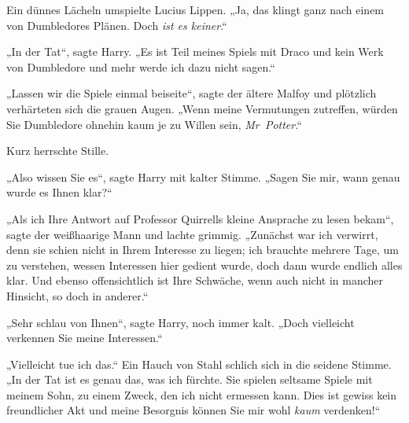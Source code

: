 Ein dünnes Lächeln umspielte Lucius Lippen.
„Ja, das klingt ganz nach einem von Dumbledores Plänen. Doch \emph{ist es keiner}.“

„In der Tat“, sagte Harry.
„Es ist Teil meines Spiels mit Draco und kein Werk von Dumbledore und mehr werde ich dazu nicht sagen.“

„Lassen wir die Spiele einmal beiseite“, sagte der ältere Malfoy und plötzlich verhärteten sich die grauen Augen.
„Wenn meine Vermutungen zutreffen, würden Sie Dumbledore ohnehin kaum je zu Willen sein, \emph{Mr~Potter}.“

Kurz herrschte Stille.

„Also wissen Sie es“, sagte Harry mit kalter Stimme.
„Sagen Sie mir, wann genau wurde es Ihnen klar?“

„Als ich Ihre Antwort auf Professor Quirrells kleine Ansprache zu lesen bekam“, sagte der weißhaarige Mann und lachte grimmig.
„Zunächst war ich verwirrt, denn sie schien nicht in Ihrem Interesse zu liegen; ich brauchte mehrere Tage, um zu verstehen, wessen Interessen hier gedient wurde, doch dann wurde endlich alles klar. Und ebenso offensichtlich ist Ihre Schwäche, wenn auch nicht in mancher Hinsicht, so doch in anderer.“

„Sehr schlau von Ihnen“, sagte Harry, noch immer kalt.
„Doch vielleicht verkennen Sie meine Interessen.“

„Vielleicht tue ich das.“ Ein Hauch von Stahl schlich sich in die seidene Stimme.
„In der Tat ist es genau das, was ich fürchte. Sie spielen seltsame Spiele mit meinem Sohn, zu einem Zweck, den ich nicht ermessen kann. Dies ist gewiss kein freundlicher Akt und meine Besorgnis können Sie mir wohl \emph{kaum} verdenken!“

